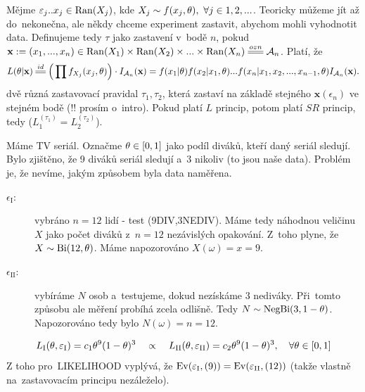 \begin{example}
	Mějme $\varepsilon_j..x_j\in\mathop{\mathrm{Ran}}(X_j)$, kde $X_j\sim f(x_j,\theta),~\forall j\in 1,2,...$. Teoricky můžeme jít až do~nekonečna, ale někdy chceme experiment zastavit, abychom mohli vyhodnotit data. Definujeme tedy $\tau$ jako zastavení v~bodě $n$, pokud $\textbf{x}:=(x_1,...,x_n)\in\Ran(X_1)\times\Ran(X_2)\times...\times\Ran(X_n)\equal{ozn}\Aa_n$. Platí, že
	$$ L(\t|\textbf{x})\equal{id}\Big(\prod f_{X_j}(x_j,\t) \Big)\cdot I_{\Aa_n}(\textbf{x})=f(x_1|\t)f(x_2|x_1,\t)...f(x_n|x_1,x_2,...,x_{n-1},\t)I_{\Aa_n}(\textbf{x}).$$
	dvě různá zastavovací pravidal $\tau_1,\tau_2$, která zastaví na základě stejného $\textbf{x}(\epsilon_n)$ ve stejném bodě (!! prosím o~intro). Pokud platí $L$ princip, potom platí $SR$ princip, tedy ($L_1^{(\tau_1)}=L_2^{(\tau_2)}$).
\end{example}
\begin{example}
	Máme TV seriál. Označme $\theta\in[0,1]$ jako podíl diváků, kteří daný seriál sledují. Bylo zjištěno, že 9 diváků seriál sledují a~3 nikoliv (to jsou naše data). Problém je, že nevíme, jakým způsobem byla data naměřena. 
	\begin{description}
		\item[$\epsilon_\mathrm{I}:$] vybráno $n=12$ lidí - test (9DIV,3NEDIV). Máme tedy náhodnou veličinu $X$ jako počet diváků z~$n=12$ nezávislých opakování. Z~toho plyne, že $X\sim \mathrm{Bi}(12,\theta)$. Máme napozorováno $X(\omega)=x=9$.
		\item[$\epsilon_\mathrm{II}:$] vybíráme $N$ osob a~testujeme, dokud nezískáme $3$ nediváky. Při~tomto způsobu ale měření probíhá zcela odlišně. Tedy $N\sim\mathrm{NegBi}(3,1-\theta)$. Napozorováno tedy bylo $N(\omega)=n=12$.
	\end{description}
$$ L_\mathrm{I}(\theta,\varepsilon_\mathrm{I})=c_1\theta^9(1-\theta)^3\quad\propto\quad L_\mathrm{II}(\theta,\varepsilon_\mathrm{II})=c_2\theta^9(1-\theta)^3,\quad \forall\theta\in[0,1] $$
Z toho pro~LIKELIHOOD vyplývá, že $\mathrm{Ev}(\varepsilon_\mathrm{I},(9))=\mathrm{Ev}(\varepsilon_\mathrm{II},(12))$ (takže vlastně na~zastavovacím principu nezáleželo).
\end{example}

